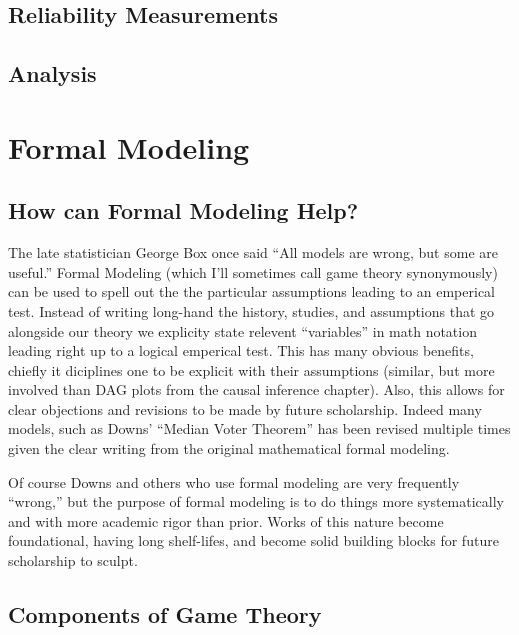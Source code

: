\documentclass[12pt]{article}\usepackage[]{graphicx}\usepackage[]{color}
\begin{document}
\begin{flushleft}
\subsection{Reliability Measurements}

\subsection{Analysis}




\clearpage
\section{Formal Modeling}

\subsection{How can Formal Modeling Help?} 

The late statistician George Box once said ``All models are wrong, but some are useful.'' Formal Modeling (which I'll sometimes call game theory synonymously) can be used to spell out the the particular assumptions leading to an emperical test. Instead of writing long-hand the history, studies, and assumptions that go alongside our theory we explicity state relevent ``variables'' in math notation leading right up to a logical emperical test. This has many obvious benefits, chiefly it diciplines one to be explicit with their assumptions (similar, but more involved than DAG plots from the causal inference chapter). Also, this allows for clear objections and revisions to be made by future scholarship. Indeed many models, such as Downs' ``Median Voter Theorem'' has been revised multiple times given the clear writing from the original mathematical formal modeling.

Of course Downs and others who use formal modeling are very frequently ``wrong,'' but the purpose of formal modeling is to do things more systematically and with more academic rigor than prior. Works of this nature become foundational, having long shelf-lifes, and become solid building blocks for future scholarship to sculpt.


\subsection{Components of Game Theory}

\hfill \\


\end{flushleft}
\end{document}
